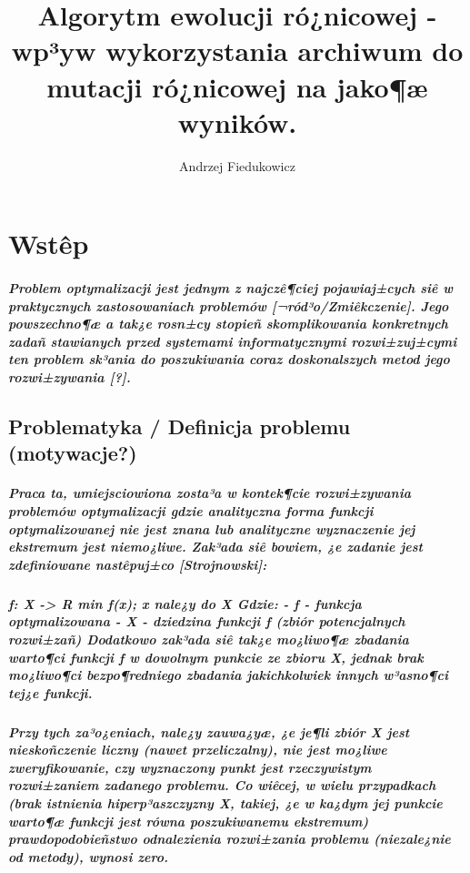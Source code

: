 \documentclass[11pt]{report}
\title{\textbf{Algorytm ewolucji ró¿nicowej - wp³yw wykorzystania archiwum do mutacji ró¿nicowej na jako¶æ wyników.}}
\author{Andrzej Fiedukowicz}
\date{}
\begin{document}
\maketitle
\tableofcontents


\chapter{Wstêp}
\paragraph{
Problem optymalizacji jest jednym z najczê¶ciej pojawiaj±cych siê w praktycznych zastosowaniach problemów [¬ród³o/Zmiêkczenie].
Jego powszechno¶æ a tak¿e rosn±cy stopieñ skomplikowania konkretnych zadañ stawianych przed systemami informatycznymi rozwi±zuj±cymi ten problem sk³ania do poszukiwania coraz doskonalszych metod jego rozwi±zywania [?].
}
\section{Problematyka / Definicja problemu (motywacje?)} %
\paragraph{
Praca ta, umiejsciowiona zosta³a w kontek¶cie rozwi±zywania problemów optymalizacji gdzie analityczna forma funkcji optymalizowanej nie jest znana lub analityczne wyznaczenie jej ekstremum jest niemo¿liwe. Zak³ada siê bowiem, ¿e zadanie jest zdefiniowane nastêpuj±co [Strojnowski]:
}
\paragraph{
	f: X -> R
	min f(x); x nale¿y do X
Gdzie: 
 	- f - funkcja optymalizowana
	- X - dziedzina funkcji f (zbiór potencjalnych rozwi±zañ)
Dodatkowo zak³ada siê tak¿e mo¿liwo¶æ zbadania warto¶ci funkcji f w dowolnym punkcie ze zbioru X, jednak brak mo¿liwo¶ci bezpo¶redniego zbadania jakichkolwiek innych w³asno¶ci tej¿e funkcji.
}
\paragraph{
Przy tych za³o¿eniach, nale¿y zauwa¿yæ, ¿e je¶li zbiór X jest nieskoñczenie liczny (nawet przeliczalny), nie jest mo¿liwe zweryfikowanie, czy wyznaczony punkt jest rzeczywistym rozwi±zaniem zadanego problemu. Co wiêcej, w wielu przypadkach (brak istnienia hiperp³aszczyzny X, takiej, ¿e w ka¿dym jej punkcie warto¶æ funkcji jest równa poszukiwanemu ekstremum) prawdopodobieñstwo odnalezienia rozwi±zania problemu (niezale¿nie od metody), wynosi zero.
}
\end{document}
